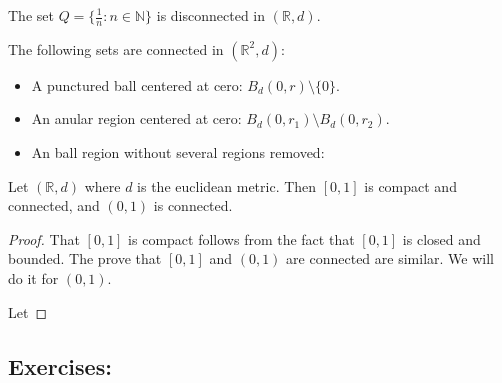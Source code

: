 \documentclass[
	fontsize=10pt, %
	twoside=false, %
	secnumdepth=1, %
]{kaobook}
\begin{document}
\begin{example}
The set $Q=\{\frac{1}{n}:n\in\mathbb{N}\}$ is disconnected in $(\mathbb{R},d).$
\end{example}

\begin{example}
The following sets are connected in $(\mathbb{R}^2,d):$

\begin{itemize}
\item A punctured ball centered at cero: $B_d(0,r)\setminus\{0\}.$

\item An anular region centered at cero: $B_d(0,r_1)\setminus B_d(0,r_2).$

\item An ball region without several regions removed:
\end{itemize}
\end{example}

\begin{theorem}
Let $(\mathbb{R},d)$ where $d$ is the euclidean metric. Then $[0,1]$ is compact and connected, and $(0,1)$ is connected.
\end{theorem}

\begin{proof}
That $[0,1]$ is compact follows from the fact that $[0,1]$ is closed and bounded. The prove that $[0,1]$ and $(0,1)$ are connected are similar. We will do it for $(0,1).$

Let 
\end{proof}

\subsection{Exercises:}
\end{document}
